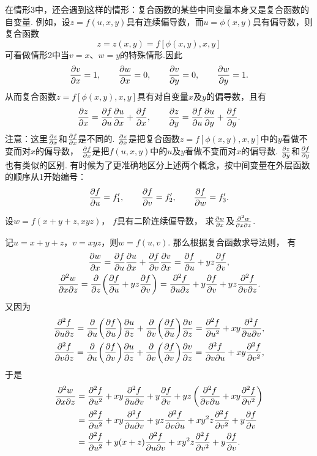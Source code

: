 在情形3中，还会遇到这样的情形：复合函数的某些中间变量本身又是复合函数的自变量.
例如，设\(z = f(u,x,y)\)具有连续偏导数，而\(u=\phi(x,y)\)具有偏导数，则复合函数\begin{equation*}
z = z(x,y) = f[\phi(x,y),x,y]
\end{equation*}可看做情形2中当\(v=x\)、\(w=y\)的特殊情形.因此\begin{equation*}
	\pdv{v}{x} = 1, \qquad
	\pdv{w}{x} = 0, \qquad
	\pdv{v}{y} = 0, \qquad
	\pdv{w}{y} = 1.
\end{equation*}
从而复合函数\(z = f[\phi(x,y),x,y]\)具有对自变量\(x\)及\(y\)的偏导数，且有\begin{equation*}
	\pdv{z}{x} = \pdv{f}{u} \pdv{u}{x} + \pdv{f}{x},
	\qquad
	\pdv{z}{y} = \pdv{f}{u} \pdv{u}{y} + \pdv{f}{y}.
\end{equation*}
注意：这里\(\pdv{z}{x}\)和\(\pdv{f}{x}\)是不同的.
\(\pdv{z}{x}\)是把复合函数\(z = f[\phi(x,y),x,y]\)中的\(y\)看做不变而对\(x\)的偏导数，
\(\pdv{f}{x}\)是把\(f(u,x,y)\)中的\(u\)及\(y\)看做不变而对\(x\)的偏导数.
\(\pdv{z}{y}\)和\(\pdv{f}{y}\)也有类似的区别.
有时候为了更准确地区分上述两个概念，按中间变量在外层函数的顺序从1开始编号：\begin{equation*}
	\pdv{f}{u} = f_1', \qquad
	\pdv{f}{v} = f_2', \qquad
	\pdv{f}{w} = f_3'.
\end{equation*}

\begin{example}
设\(w = f(x+y+z,xyz)\)，
\(f\)具有二阶连续偏导数，
求\(\pdv{w}{x}\)及\(\pdv[2]{w}{x}{z}\).
\begin{solution}
记\(u = x+y+z\)，\(v = xyz\)，则\(w = f(u,v)\).
那么根据复合函数求导法则，
有\begin{gather*}
	\pdv{w}{x} = \pdv{f}{u} \pdv{u}{x} + \pdv{f}{v} \pdv{v}{x}
	= \pdv{f}{u} + yz \pdv{f}{v}, \\
	\pdv[2]{w}{x}{z} = \pdv{z}(\pdv{f}{u} + yz \pdv{f}{v})
	= \pdv[2]{f}{u}{z} + y\pdv{f}{v} + yz \pdv[2]{f}{v}{z}.
\end{gather*}
又因为\begin{gather*}
	\pdv[2]{f}{u}{z}
	= \pdv{u}(\pdv{f}{u}) \pdv{u}{z} + \pdv{v}(\pdv{f}{u}) \pdv{v}{z}
	= \pdv[2]{f}{u} + xy \pdv[2]{f}{u}{v}, \\
	\pdv[2]{f}{v}{z}
	= \pdv{u}(\pdv{f}{v}) \pdv{u}{z} + \pdv{v}(\pdv{f}{v}) \pdv{v}{z}
	= \pdv[2]{f}{v}{u} + xy \pdv[2]{f}{v},
\end{gather*}
于是\begin{align*}
	\pdv[2]{w}{x}{z}
	&= \pdv[2]{f}{u} + xy \pdv[2]{f}{u}{v}
	+ y\pdv{f}{v} + yz \left( \pdv[2]{f}{v}{u} + xy \pdv[2]{f}{v} \right) \\
	&= \pdv[2]{f}{u}
	+ xy \pdv[2]{f}{u}{v} + yz \pdv[2]{f}{v}{u}
	+ x y^2 z \pdv[2]{f}{v}
	+ y \pdv{f}{v} \\
	&= \pdv[2]{f}{u}
	+ y(x+z) \pdv[2]{f}{u}{v}
	+ x y^2 z \pdv[2]{f}{v}
	+ y \pdv{f}{v}.
\end{align*}
\end{solution}
\end{example}

